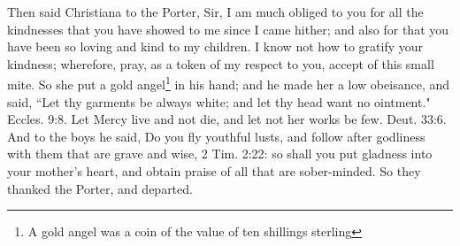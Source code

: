 Then said Christiana to the Porter, Sir, I am much obliged to you for all the kindnesses that you have showed to me since I came hither; and also for that you have been so loving and kind to my children. I know not how to gratify your kindness; wherefore, pray, as a token of my respect to you, accept of this small mite. So she put a gold angel\footnote{A gold angel was a coin of the value of ten shillings sterling} in his hand; and he made her a low obeisance, and said, ``Let thy garments be always white; and let thy head want no ointment." Eccles. 9:8. Let Mercy live and not die, and let not her works be few. Deut. 33:6. And to the boys he said, Do you fly youthful lusts, and follow after godliness with them that are grave and wise, 2 Tim. 2:22: so shall you put gladness into your mother's heart, and obtain praise of all that are sober-minded. So they thanked the Porter, and departed. 
